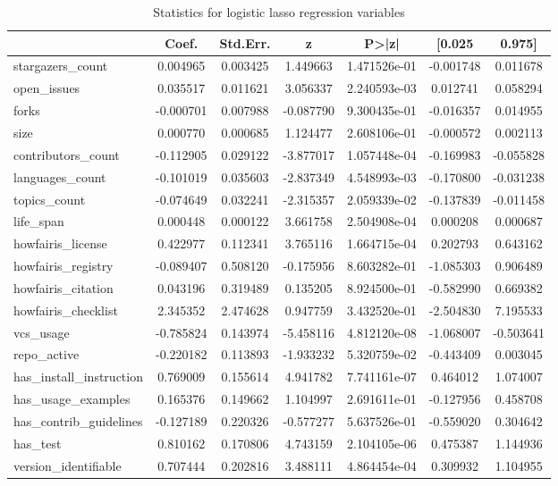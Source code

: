 \begin{table}
\centering
\caption{Statistics for logistic lasso regression variables}
\label{tab:stats_logit_vars}
\begin{tabular}{lcccccc}
\toprule
{} &     Coef. &  Std.Err. &         z &         P>|z| &    [0.025 &    0.975] \\
\midrule
stargazers\_count        &  0.004965 &  0.003425 &  1.449663 &  1.471526e-01 & -0.001748 &  0.011678 \\
open\_issues             &  0.035517 &  0.011621 &  3.056337 &  2.240593e-03 &  0.012741 &  0.058294 \\
forks                   & -0.000701 &  0.007988 & -0.087790 &  9.300435e-01 & -0.016357 &  0.014955 \\
size                    &  0.000770 &  0.000685 &  1.124477 &  2.608106e-01 & -0.000572 &  0.002113 \\
contributors\_count      & -0.112905 &  0.029122 & -3.877017 &  1.057448e-04 & -0.169983 & -0.055828 \\
languages\_count         & -0.101019 &  0.035603 & -2.837349 &  4.548993e-03 & -0.170800 & -0.031238 \\
topics\_count            & -0.074649 &  0.032241 & -2.315357 &  2.059339e-02 & -0.137839 & -0.011458 \\
life\_span               &  0.000448 &  0.000122 &  3.661758 &  2.504908e-04 &  0.000208 &  0.000687 \\
howfairis\_license       &  0.422977 &  0.112341 &  3.765116 &  1.664715e-04 &  0.202793 &  0.643162 \\
howfairis\_registry      & -0.089407 &  0.508120 & -0.175956 &  8.603282e-01 & -1.085303 &  0.906489 \\
howfairis\_citation      &  0.043196 &  0.319489 &  0.135205 &  8.924500e-01 & -0.582990 &  0.669382 \\
howfairis\_checklist     &  2.345352 &  2.474628 &  0.947759 &  3.432520e-01 & -2.504830 &  7.195533 \\
vcs\_usage               & -0.785824 &  0.143974 & -5.458116 &  4.812120e-08 & -1.068007 & -0.503641 \\
repo\_active             & -0.220182 &  0.113893 & -1.933232 &  5.320759e-02 & -0.443409 &  0.003045 \\
has\_install\_instruction &  0.769009 &  0.155614 &  4.941782 &  7.741161e-07 &  0.464012 &  1.074007 \\
has\_usage\_examples      &  0.165376 &  0.149662 &  1.104997 &  2.691611e-01 & -0.127956 &  0.458708 \\
has\_contrib\_guidelines  & -0.127189 &  0.220326 & -0.577277 &  5.637526e-01 & -0.559020 &  0.304642 \\
has\_test                &  0.810162 &  0.170806 &  4.743159 &  2.104105e-06 &  0.475387 &  1.144936 \\
version\_identifiable    &  0.707444 &  0.202816 &  3.488111 &  4.864454e-04 &  0.309932 &  1.104955 \\
\bottomrule
\end{tabular}
\end{table}
